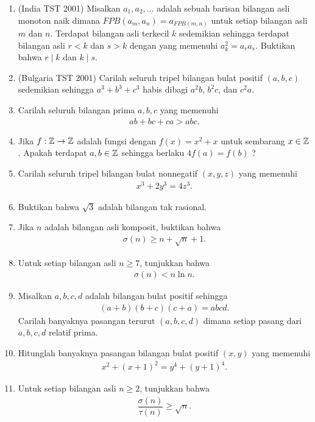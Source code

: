 \documentclass[11pt]{scrartcl}
\begin{document}
\begin{enumerate}
    \item (India TST 2001) Misalkan $a_1,a_2,\dots$ adalah sebuah barisan bilangan asli monoton naik dimana $FPB(a_m,a_n)=a_{FPB(m,n)}$ untuk setiap bilangan asli $m$ dan $n$. Terdapat bilangan asli terkecil $k$ sedemikian sehingga terdapat bilangan asli $r<k$ dan $s>k$ dengan yang memenuhi $a_k^2=a_ra_s$. Buktikan bahwa $r \mid k$ dan $k \mid s$.

    \item (Bulgaria TST 2001) Carilah seluruh tripel bilangan bulat positif $(a,b,c)$ sedemikian sehingga $a^3+b^3+c^3$ habis dibagi $a^2b$, $b^2c$, dan $c^2a$.

    \item Carilah seluruh bilangan prima $a,b,c$ yang memenuhi
    \begin{align*}
        ab+bc+ca > abc.
    \end{align*}
    
    \item Jika $f: \mathbb Z \to \mathbb Z$ adalah fungsi dengan $f(x)=x^2+x$ untuk sembarang $x \in \mathbb Z$. Apakah terdapat $a,b \in \mathbb Z$ sehingga berlaku $4f(a)=f(b)$ ?
    
    \item Carilah seluruh tripel bilangan bulat nonnegatif $(x,y,z)$ yang memenuhi
    \begin{align*}
        x^3+2y^3=4z^3.
    \end{align*}

    \item Buktikan bahwa $\sqrt{3}$ adalah bilangan tak rasional.
    
    \item Jika $n$ adalah bilangan asli komposit, buktikan bahwa
    \begin{align*}
        \sigma(n) \ge n + \sqrt{n} + 1.
    \end{align*}

    \item Untuk setiap bilangan asli $n \ge 7$, tunjukkan bahwa
    \begin{align*}
        \sigma(n) < n \ln n.
    \end{align*}

        \item Misalkan $a,b,c,d$ adalah bilangan bulat positif sehingga
    \begin{align*}
        (a+b)(b+c)(c+a) = abcd.
    \end{align*}
    Carilah banyaknya pasangan terurut $(a,b,c,d)$ dimana setiap pasang dari $a,b,c,d$ relatif prima.
    
    \item Hitunglah banyaknya pasangan bilangan bulat positif $(x,y)$ yang memenuhi
    \begin{align*}
        x^2+(x+1)^2 = y^4 + (y+1)^4.
    \end{align*}

    \item Untuk setiap bilangan asli $n \ge 2$, tunjukkan bahwa
    \begin{align*}
        \dfrac{\sigma(n)}{\tau(n)} \ge \sqrt{n}.
    \end{align*}
\end{enumerate}
\end{document}
